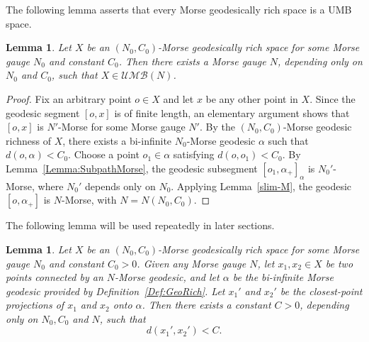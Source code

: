 \documentclass[a4paper,11pt,oneside]{article}
\newtheorem{Lemma}[Theorem]{Lemma}
\begin{document}
The following lemma asserts that every Morse geodesically rich space is a UMB space.

\begin{Lemma}\label{N-ray}  
Let $X$ be an $(N_0, C_0)$-Morse geodesically rich space for some Morse gauge $N_0$ and constant $C_0$. Then there exists a Morse gauge $N$, depending only on $N_0$ and $C_0$, such that $X\in \mathcal{UMB}(N)$. 
\end{Lemma}

\begin{proof}
Fix an arbitrary point $o\in X$ and let $x$ be any other point in $X$. Since the geodesic segment $[o, x]$ is of finite length, an elementary argument shows that $[o, x]$ is $N'$-Morse for some Morse gauge $N'$. 
    By the $(N_0, C_0)$-Morse geodesic richness of $X$, there exists a bi-infinite $N_0$-Morse geodesic $\alpha$ such that $d(o, \alpha)<C_0$. 
    Choose a point $o_1\in \alpha$ satisfying $d(o, o_1)<C_0$. By Lemma~\ref{Lemma:SubpathMorse}, the geodesic subsegment $[o_1, \alpha_+]_{\alpha}$ is $N_0'$-Morse, where $N_0'$ depends only on $N_0$. 
    Applying  Lemma~\ref{slim-M}, the geodesic $[o, \alpha_+]$ is $N$-Morse, with $N=N(N_0, C_0)$.
    
     
\end{proof}

The following lemma will be used repeatedly in later sections.

\begin{Lemma}\label{keybound}
   Let $X$ be an $(N_0, C_0)$-Morse geodesically rich space for some Morse gauge $N_0$ and constant $C_0>0$. Given any Morse gauge $N$, let $x_1, x_2\in X$ be two points connected by an $N$-Morse geodesic, and let $\alpha$ be the bi-infinite Morse geodesic provided by Definition~\ref{Def:GeoRich}.
    Let $x_1'$ and $x_2'$  be the closest-point projections of $x_1$ and $x_2$ onto $\alpha$.
Then there exists a constant $C>0$, depending only on $N_0, C_0$ and $N$, such that 
\[
d(x_1', x_2')< C.
\]
\end{Lemma}
\end{document}

